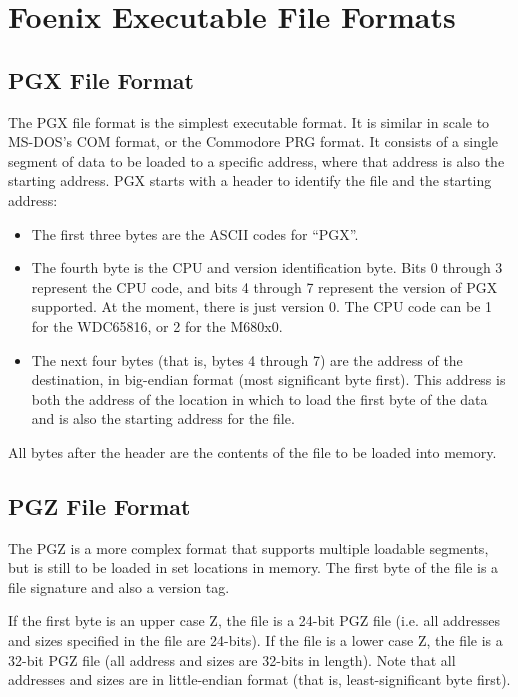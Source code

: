 \section{Foenix Executable File Formats}

\subsection*{PGX File Format}
The PGX file format is the simplest executable format. It is similar in scale to MS-DOS's COM format, or the Commodore PRG format.
It consists of a single segment of data to be loaded to a specific address, where that address is also the starting address.
PGX starts with a header to identify the file and the starting address:

\begin{itemize}
	\item The first three bytes are the ASCII codes for ``PGX''. 
    \item The fourth byte is the CPU and version identification byte.
	Bits 0 through 3 represent the CPU code, and bits 4 through 7 represent the version of PGX supported.
	At the moment, there is just version 0. The CPU code can be 1 for the WDC65816, or 2 for the M680x0.
    \item The next four bytes (that is, bytes 4 through 7) are the address of the destination, in big-endian format (most significant byte first).
	This address is both the address of the location in which to load the first byte of the data and is also the starting address for the file.
\end{itemize}

All bytes after the header are the contents of the file to be loaded into memory.

\subsection*{PGZ File Format}
The PGZ is a more complex format that supports multiple loadable segments, but is still to be loaded in set locations in memory.
The first byte of the file is a file signature and also a version tag.

If the first byte is an upper case Z, the file is a 24-bit PGZ file (i.e. all addresses and sizes specified in the file are 24-bits).
If the file is a lower case Z, the file is a 32-bit PGZ file (all address and sizes are 32-bits in length).
Note that all addresses and sizes are in little-endian format (that is, least-significant byte first).

